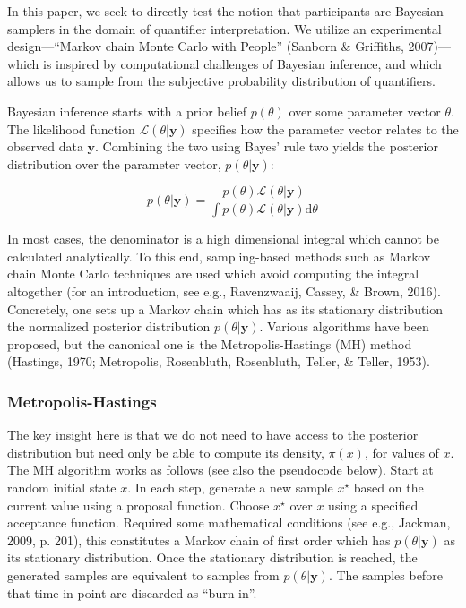 \documentclass[english,floatsintext,man]{apa6}
\begin{document}
In this paper, we seek to directly test the notion that participants are
Bayesian samplers in the domain of quantifier interpretation. We utilize
an experimental design---\enquote{Markov chain Monte Carlo with People}
(Sanborn \& Griffiths, 2007)---which is inspired by computational
challenges of Bayesian inference, and which allows us to sample from the
subjective probability distribution of quantifiers.

Bayesian inference starts with a prior belief \(p(\theta)\) over some
parameter vector \(\theta\). The likelihood function
\(\mathcal{L}(\theta|\textbf{y})\) specifies how the parameter vector
relates to the observed data \(\textbf{y}\). Combining the two using
Bayes' rule two yields the posterior distribution over the parameter
vector, \(p(\theta|\textbf{y})\):

\[
p(\theta|\textbf{y}) = \frac{p(\theta)\mathcal{L}(\theta|\textbf{y})}{\int p(\theta)\mathcal{L}(\theta|\textbf{y})\mathrm{d}\theta}
\]

In most cases, the denominator is a high dimensional integral which
cannot be calculated analytically. To this end, sampling-based methods
such as Markov chain Monte Carlo techniques are used which avoid
computing the integral altogether (for an introduction, see e.g.,
Ravenzwaaij, Cassey, \& Brown, 2016). Concretely, one sets up a Markov
chain which has as its stationary distribution the normalized posterior
distribution \(p(\theta|\textbf{y})\). Various algorithms have been
proposed, but the canonical one is the Metropolis-Hastings (MH) method
(Hastings, 1970; Metropolis, Rosenbluth, Rosenbluth, Teller, \& Teller,
1953).

\subsubsection{Metropolis-Hastings}\label{metropolis-hastings}

The key insight here is that we do not need to have access to the
posterior distribution but need only be able to compute its density,
\(\pi(x)\), for values of \(x\). The MH algorithm works as follows (see
also the pseudocode below). Start at random initial state \(x\). In each
step, generate a new sample \(x^{\star}\) based on the current value
using a proposal function. Choose \(x^{\star}\) over \(x\) using a
specified acceptance function. Required some mathematical conditions
(see e.g., Jackman, 2009, p. 201), this constitutes a Markov chain of
first order which has \(p(\theta|\textbf{y})\) as its stationary
distribution. Once the stationary distribution is reached, the generated
samples are equivalent to samples from \(p(\theta|\textbf{y})\). The
samples before that time in point are discarded as \enquote{burn-in}.
\end{document}
